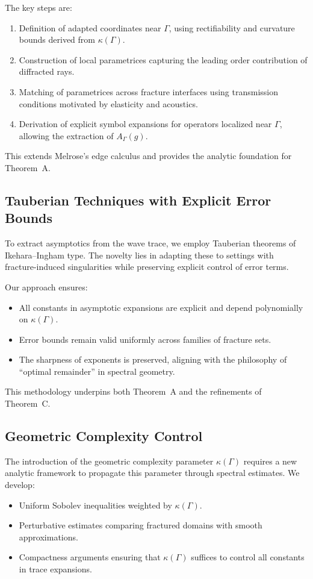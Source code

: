 The key steps are:
\begin{enumerate}
  \item Definition of adapted coordinates near $\Gamma$, using rectifiability 
  and curvature bounds derived from $\kappa(\Gamma)$.
  \item Construction of local parametrices capturing the leading order 
  contribution of diffracted rays.
  \item Matching of parametrices across fracture interfaces using transmission 
  conditions motivated by elasticity and acoustics.
  \item Derivation of explicit symbol expansions for operators localized near 
  $\Gamma$, allowing the extraction of $A_\Gamma(g)$.
\end{enumerate}

This extends Melrose’s edge calculus and provides the analytic foundation for 
Theorem~A.

\subsection{Tauberian Techniques with Explicit Error Bounds}

To extract asymptotics from the wave trace, we employ Tauberian theorems of 
Ikehara–Ingham type. The novelty lies in adapting these to settings with 
fracture-induced singularities while preserving explicit control of error 
terms. 

Our approach ensures:
\begin{itemize}
  \item All constants in asymptotic expansions are explicit and depend 
  polynomially on $\kappa(\Gamma)$.
  \item Error bounds remain valid uniformly across families of fracture sets.
  \item The sharpness of exponents is preserved, aligning with the philosophy 
  of “optimal remainder” in spectral geometry.
\end{itemize}

This methodology underpins both Theorem~A and the refinements of Theorem~C.

\subsection{Geometric Complexity Control}

The introduction of the geometric complexity parameter $\kappa(\Gamma)$ 
requires a new analytic framework to propagate this parameter through 
spectral estimates. We develop:
\begin{itemize}
  \item Uniform Sobolev inequalities weighted by $\kappa(\Gamma)$.
  \item Perturbative estimates comparing fractured domains with smooth 
  approximations.
  \item Compactness arguments ensuring that $\kappa(\Gamma)$ suffices to 
  control all constants in trace expansions.
\end{itemize}


